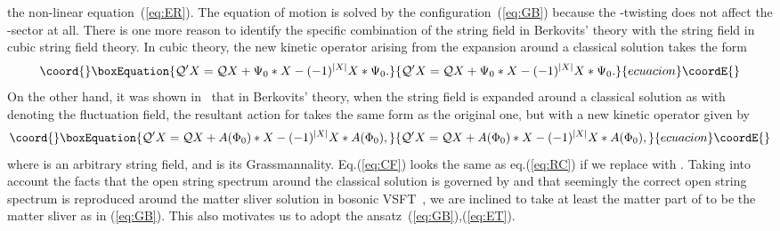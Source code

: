 \documentclass[a4paper,12pt]{article}
\providecommand{\cQ}{\mathcal{Q}}
\begin{document}
the non-linear equation~(\ref{eq:ER}).
The equation of motion \coordHE{} is solved by the 
configuration~(\ref{eq:GB}) because the \coordHE{}-twisting does not affect the \myHighlight{$\xi\eta$}\coordHE{}-sector at all. 
There is one more reason to identify the specific combination \coordHE{} of the string field 
\myHighlight{$\widehat{\Phi}$}\coordHE{} in Berkovits' theory with the string field \myHighlight{$\Psi$}\coordHE{} in cubic string field theory. 
In cubic theory, the new kinetic operator \myHighlight{$\cQ^{\prime}$}\coordHE{} arising from the expansion around a 
classical solution \coordHE{} takes the form 
\begin{equation}\coord{}\boxEquation{
\cQ^{\prime}X=\cQ X+\Psi_0*X-(-1)^{|X|}X*\Psi_0. \label{eq:RC}
}{
\cQ^{\prime}X=\cQ X+\Psi_0*X-(-1)^{|X|}X*\Psi_0. }{ecuacion}\coordE{}\end{equation}
On the other hand, it was shown in~\cite{Klu5,MS} 
that in Berkovits' theory, when the string field \myHighlight{$\Phi$}\coordHE{} is expanded around a classical 
solution \coordHE{} as \coordHE{} with \myHighlight{$\phi$}\coordHE{} denoting the fluctuation field, 
the resultant action for \myHighlight{$\phi$}\coordHE{} takes the same form as the original one, but with a new 
kinetic operator \myHighlight{$\cQ^{\prime}$}\coordHE{} given by 
\begin{equation}\coord{}\boxEquation{
\cQ^{\prime}X=\cQ X+A(\Phi_0)*X-(-1)^{|X|}X*A(\Phi_0), \label{eq:CF}
}{
\cQ^{\prime}X=\cQ X+A(\Phi_0)*X-(-1)^{|X|}X*A(\Phi_0), }{ecuacion}\coordE{}\end{equation}
where \coordHE{} is an arbitrary string field, and \coordHE{} is its Grassmannality. 
Eq.(\ref{eq:CF}) looks the same as eq.(\ref{eq:RC}) if we replace \coordHE{} with \coordHE{}. 
Taking into account the facts that the open string spectrum around the classical 
solution is governed by \myHighlight{$\cQ^{\prime}$}\coordHE{} and that 
seemingly the correct open string spectrum is reproduced around the matter sliver 
solution \coordHE{} in bosonic VSFT~\cite{HK,HM,RSZ6,HMT,RV,Okawa}, 
we are inclined to take at least the matter part of \coordHE{} to be the matter sliver \coordHE{} 
as in (\ref{eq:GB}). This also motivates us to adopt the ansatz~(\ref{eq:GB}),(\ref{eq:ET}). 
\smallskip
\end{document}
